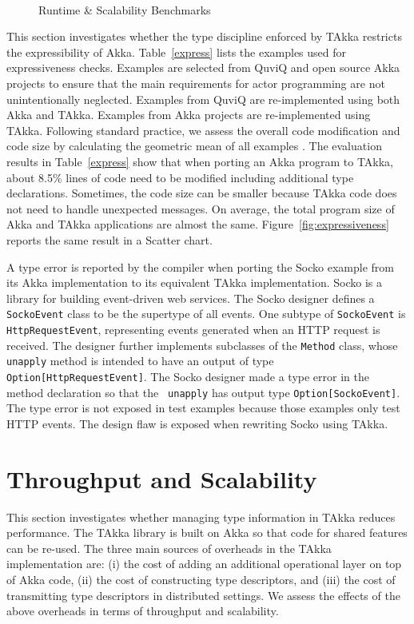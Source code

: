\begin{figure}[!ht]
\begin{center}
{        }\\
    \end{center}
    \caption{Runtime \& Scalability Benchmarks}
   \label{runtime}
\end{figure}

This section investigates whether the type discipline enforced by TAkka restricts the 
expressibility of Akka.  Table~\ref{express} lists the examples used for expressiveness checks.  
Examples are selected from QuviQ \cite{quviq}
and open source Akka projects to ensure that the main requirements for actor 
programming are not unintentionally neglected.  Examples from 
QuviQ are re-implemented using both Akka and TAkka.  Examples from 
Akka projects are re-implemented using TAkka.  Following standard practice,  
we assess the overall code modification and code 
size by calculating the geometric mean of all examples \cite{HePa06}. The evaluation results 
in Table~\ref{express} show that when porting an Akka program to TAkka, about 
8.5\% lines of code need to be modified including additional type declarations. 
Sometimes, the code size can be smaller because TAkka code does not 
need to handle unexpected messages.  On average, the total program size 
of Akka and TAkka applications are almost the same.  Figure~\ref{fig:expressiveness}
reports the same result in a Scatter chart.

A type error is reported by the compiler when porting the Socko example 
\cite{SOCKO} from its Akka implementation to its equivalent TAkka 
implementation. Socko is a library for building event-driven web services.  The 
Socko designer defines a {\tt SockoEvent} class to be the supertype of all 
events.  One subtype of {\tt SockoEvent} is {\tt HttpRequestEvent}, 
representing events generated when an HTTP request is received. The designer 
further implements subclasses of the {\tt Method} class, whose {\tt unapply} 
method is intended to have an output of type {\tt Option[HttpRequestEvent]}.  
The Socko designer made a type error in the method declaration so that the {\tt 
unapply} has output type {\tt Option[SockoEvent]}. The type error is not 
exposed in test examples because those examples only test HTTP events. 
The design flaw is exposed when rewriting Socko using TAkka.



\section{Throughput and Scalability}
\label{efficiency}
This section investigates whether managing type information in TAkka reduces
performance.  The TAkka library is built on Akka so that code for shared features 
can be re-used.  The three main sources of overheads in the TAkka implementation
are: (i) the cost of adding an additional operational layer on top of Akka 
code, (ii) the cost of constructing type descriptors, and (iii) the cost of 
transmitting type descriptors in distributed settings. We assess the effects of
the above overheads in terms of throughput and scalability.

